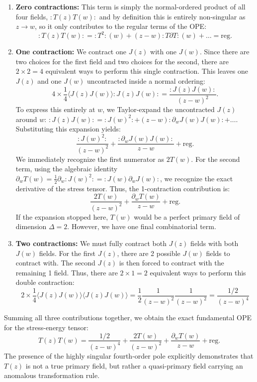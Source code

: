\begin{enumerate}
    \item \textbf{Zero contractions:} This term is simply the normal-ordered product of all four fields, \(:T(z)T(w):\) and by definition this is entirely non-singular as \(z \to w\), so it only contributes to the regular terms of the OPE:
          \[
              : T(z)T(w) : = : T^2 : (w) + (z - w) : T\partial T : (w) + \dots = \text{reg.}
          \]

    \item \textbf{One contraction:} We contract one \(J(z)\) with one \(J(w)\). Since there are two choices for the first field and two choices for the second, there are \(2 \times 2 = 4\) equivalent ways to perform this single contraction. This leaves one \(J(z)\) and one \(J(w)\) uncontracted inside a normal ordering:
          \[
              4 \times \frac{1}{4} \langle J(z)J(w) \rangle :J(z)J(w): = \frac{:J(z)J(w):}{(z-w)^2}.
          \]
          To express this entirely at \(w\), we Taylor-expand the uncontracted \(J(z)\) around \(w\): \(:J(z)J(w): = :J(w)^2: + (z-w):\partial_w J(w) J(w): + \dots\). Substituting this expansion yields:
          \[
              \frac{:J(w)^2:}{(z-w)^2} + \frac{:\partial_w J(w) J(w):}{z-w} + \text{reg.}
          \]
          We immediately recognize the first numerator as \(2T(w)\). For the second term, using the algebraic identity \(\partial_w T(w) = \frac{1}{2}\partial_w :J(w)^2: = :J(w)\partial_w J(w):\), we recognize the exact derivative of the stress tensor. Thus, the 1-contraction contribution is:
          \[
              \frac{2T(w)}{(z-w)^2} + \frac{\partial_w T(w)}{z-w} + \text{reg.}
          \]
          If the expansion stopped here, \(T(w)\) would be a perfect primary field of dimension \(\Delta = 2\). However, we have one final combinatorial term.

    \item \textbf{Two contractions:} We must fully contract both \(J(z)\) fields with both \(J(w)\) fields. For the first \(J(z)\), there are 2 possible \(J(w)\) fields to contract with. The second \(J(z)\) is then forced to contract with the remaining 1 field. Thus, there are \(2 \times 1 = 2\) equivalent ways to perform this double contraction:
          \[
              2 \times \frac{1}{4} \langle J(z)J(w) \rangle \langle J(z)J(w) \rangle = \frac{1}{2} \frac{1}{(z-w)^2} \frac{1}{(z-w)^2} = \frac{1/2}{(z-w)^4}
          \]
\end{enumerate}

Summing all three contributions together, we obtain the exact fundamental OPE for the stress-energy tensor:
\[
    T(z)T(w) = \frac{1/2}{(z-w)^4} + \frac{2T(w)}{(z-w)^2} + \frac{\partial_w T(w)}{z-w} + \text{reg.}
\]
The presence of the highly singular fourth-order pole explicitly demonstrates that \(T(z)\) is not a true primary field, but rather a quasi-primary field carrying an anomalous transformation rule.

